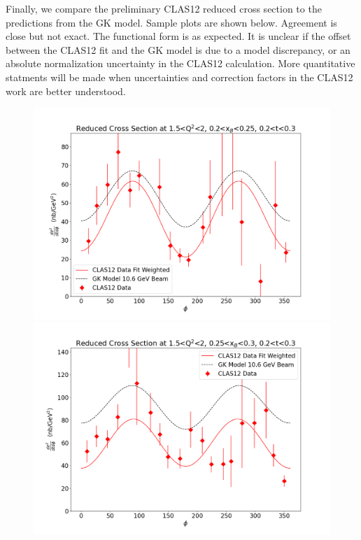 Finally, we compare the preliminary CLAS12 reduced cross section to the predictions from the GK model. Sample plots are shown below. Agreement is close but not exact. The functional form is as expected. It is unclear if the offset between the CLAS12 fit and the GK model is due to a model discrepancy, or an absolute normalization uncertainty in the CLAS12 calculation. More quantitative statments will be made when uncertainties and correction factors in the CLAS12 work are better understood.
\begin{figure}[hbt]
	\centering
	\includegraphics[page=6,width=0.45\linewidth]{Chapters/Ch5-FurtherAnalysis/pics/reduced_xsec_1.5_2_0.2_0.25_0.2_0.3.png}
	\includegraphics[page=6,width=0.45\linewidth]{Chapters/Ch5-FurtherAnalysis/pics/reduced_xsec_1.5_2_0.25_0.3_0.2_0.3.png}
\end{figure}\label{fig:oldres4}



